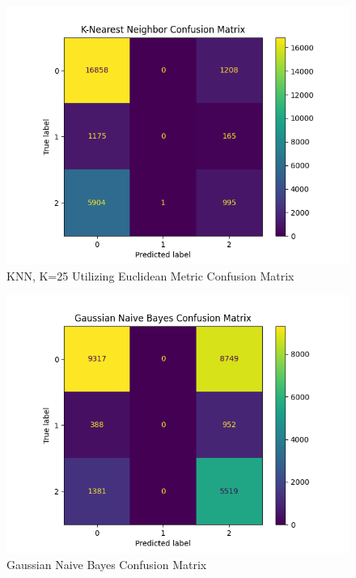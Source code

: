 \documentclass[journal]{IEEEtran}
\begin{document}
\begin{figure}[h!]
    \includegraphics[scale=0.5]{K-Nearest Neighbor_cm.png}
    \centering
    \caption{KNN, K=25 Utilizing Euclidean Metric Confusion Matrix}
    \label{fig:knn}
    \end{figure}

\begin{figure}[h!]
    \includegraphics[scale=0.5]{Gaussian Naive Bayes_cm.png}
    \centering
    \caption{Gaussian Naive Bayes Confusion Matrix}
    \label{fig:gaussnb}
    \end{figure}

\clearpage
\end{document}
